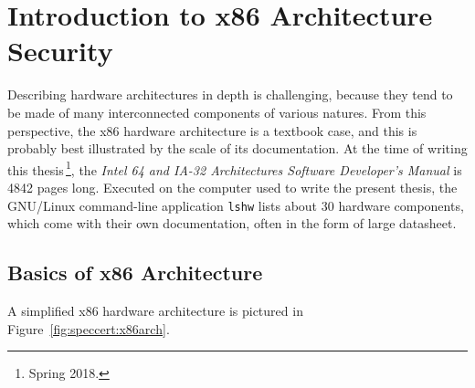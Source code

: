 \section{Introduction to x86 Architecture Security}
\label{sec:usecase:architecture}

Describing hardware architectures in depth is challenging, because they tend to
be made of many interconnected components of various natures.
%
From this perspective, the x86 hardware architecture is a textbook case, and
this is probably best illustrated by the scale of its documentation.
%
At the time of writing this thesis\,\footnote{Spring 2018.}, the \emph{Intel 64
  and IA-32 Architectures Software Developer’s Manual} is 4842 pages long.
%
Executed on the computer used to write the present thesis, the GNU/Linux
command-line application \texttt{lshw} lists about 30 hardware components, which
come with their own documentation, often in the form of large datasheet.

\subsection{Basics of x86 Architecture}

A simplified x86 hardware architecture is pictured in
Figure~\ref{fig:speccert:x86arch}.

